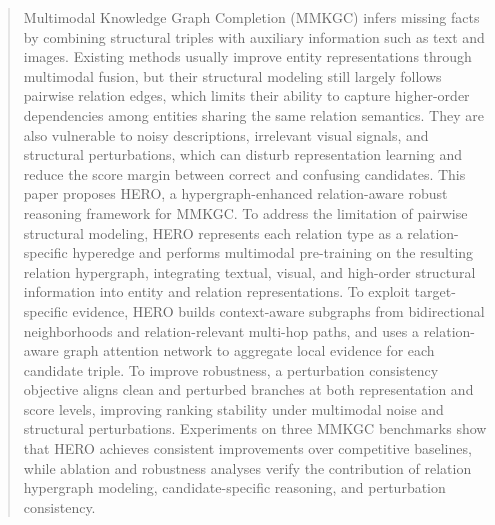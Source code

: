 \documentclass[a4paper,fleqn]{cas-sc}
\begin{document}







\begin{abstract}
Multimodal Knowledge Graph Completion (MMKGC) infers missing facts by combining structural triples with auxiliary information such as text and images. Existing methods usually improve entity representations through multimodal fusion, but their structural modeling still largely follows pairwise relation edges, which limits their ability to capture higher-order dependencies among entities sharing the same relation semantics. They are also vulnerable to noisy descriptions, irrelevant visual signals, and structural perturbations, which can disturb representation learning and reduce the score margin between correct and confusing candidates. This paper proposes HERO, a hypergraph-enhanced relation-aware robust reasoning framework for MMKGC. To address the limitation of pairwise structural modeling, HERO represents each relation type as a relation-specific hyperedge and performs multimodal pre-training on the resulting relation hypergraph, integrating textual, visual, and high-order structural information into entity and relation representations. To exploit target-specific evidence, HERO builds context-aware subgraphs from bidirectional neighborhoods and relation-relevant multi-hop paths, and uses a relation-aware graph attention network to aggregate local evidence for each candidate triple. To improve robustness, a perturbation consistency objective aligns clean and perturbed branches at both representation and score levels, improving ranking stability under multimodal noise and structural perturbations. Experiments on three MMKGC benchmarks show that HERO achieves consistent improvements over competitive baselines, while ablation and robustness analyses verify the contribution of relation hypergraph modeling, candidate-specific reasoning, and perturbation consistency.

\end{abstract}
\end{document}
